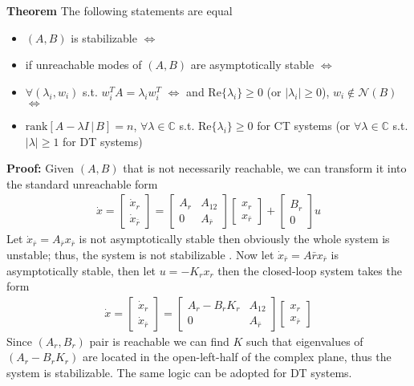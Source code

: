 \documentclass[twoside]{article}
\begin{document}
\textbf{Theorem} The following statements are equal 
\begin{itemize}
\item $(A,B)$ is stabilizable $\iff$
\item if unreachable modes of $(A,B)$ are asymptotically stable $\iff$
\item $\forall (\lambda_i , w_i)$ s.t. $w_i^T A = \lambda_i w_i^T$ $\iff$
and $\mathrm{Re}\lbrace \lambda_i \rbrace \geq 0$ (or $|\lambda_i|\geq0$),
$w_i \notin \mathcal{N}(B)$ $\iff$
\item $\mathrm{rank}\left[ A - \lambda I \, | \, B \right] = n$,
$\forall \lambda \in \mathbb{C}$ s.t. $\mathrm{Re}\lbrace \lambda_i \rbrace \geq 0$ for CT systems (or $\forall \lambda \in \mathbb{C}$ s.t. $|\lambda|  \geq 1$ for DT systems)
\end{itemize}

\textbf{Proof:} Given $(A,B)$ that is not necessarily reachable, we can transform it into the standard unreachable form
%
\begin{align*}
\dot{x} = \left[ \begin{array}{c} \dot{x}_r \\ \dot{x}_{\bar{r}} \end{array} \right]  = \left[ \begin{array}{c|c} A_{r} & A_{12} \\ \hline 0 & A_{\bar{r}} \end{array} \right] \left[ \begin{array}{c} x_r \\ x_{\bar{r}} \end{array} \right]  
+ \left[ \begin{array}{c} B_r \\ 0 \end{array} \right] u
\end{align*}
%
Let $\dot{x}_{\bar{r}} = A_{\bar{r}} x_{\bar{r}}$ is not asymptotically stable then obviously 
the whole system is unstable; thus, the system is not stabilizable .
%
Now let $\dot{x}_{\bar{r}} = A\bar{r} x_{\bar{r}}$ is asymptotically stable, then 
let $u = - K_{r} x_{r}$ then the closed-loop system takes the form
%
\begin{align*}
\dot{x} = \left[ \begin{array}{c} \dot{x}_r \\ \dot{x}_{\bar{r}} \end{array} \right]  = \left[ \begin{array}{c|c} A_{r} - B_r K_r & A_{12} \\ \hline 0 & A_{\bar{r}} \end{array} \right] \left[ \begin{array}{c} x_r \\ x_{\bar{r}} \end{array} \right]  
\end{align*}
%
Since $(A_r,B_r)$ pair is reachable we can find $K$ such that eigenvalues of  $(A_{r} - B_r K_r)$ are located in the
open-left-half of the complex plane, thus the system is stabilizable. The same logic can be adopted for DT systems.


\end{document}
